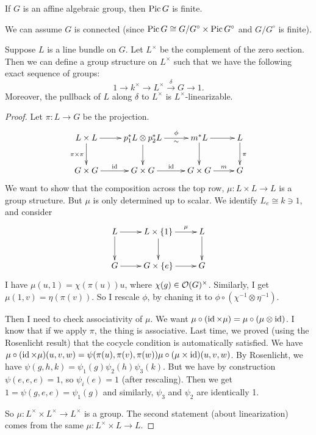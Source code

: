 
\begin{theorem}
 If $G$ is an affine algebraic group, then $\operatorname{Pic} G$ is finite.
\end{theorem}
We can assume $G$ is connected (since $\operatorname{Pic} G\cong G/G^\circ\times \operatorname{Pic} G^\circ$ and $G/G^\circ$ is finite).
\begin{proposition}
 Suppose $L$ is a line bundle on $G$. Let $L^\times$ be the complement of the zero section. Then we can define a group structure on $L^\times$ such that we have the following exact sequence of groups:
 \[
  1\to k^\times\to L^\times\xrightarrow\delta G\to 1.
 \]
 Moreover, the pullback of $L$ along $\delta$ to $L^\times$ is $L^\times$-linearizable.
\end{proposition}
\begin{proof}
 Let $\pi\colon L\to G$ be the projection.
 \[\xymatrix{
  L\times L\ar[d]_{\pi\times\pi}\ar[r] & p_1^*L\otimes p_2^*L\ar[d] \ar[r]^-\phi_-\sim & m^*L \ar[r]\ar[d] & L\ar[d]^\pi \\
  G\times G\ar[r]^\id & G\times G\ar[r]^\id & G\times G \ar[r]^-m & G
 }\]
  We want to show that the composition across the top row, $\mu\colon L\times L\to L$ is a group structure. But $\mu$ is only determined up to scalar. We identify $L_e\cong k\ni 1$, and consider
 \[\xymatrix{
  L\ar[r]\ar[d] & L\times\{1\}\ar[d]\ar[r]^-\mu & L\ar[d]\\
  G\ar[r] & G\times \{e\}\ar[r] & G
 }\]
 I have $\mu(u,1)=\chi(\pi(u))u$, where $\chi(g)\in \mathcal{O}(G)^\times$. Similarly, I get $\mu(1,v)=\eta(\pi(v))$. So I rescale $\phi$, by chaning it to $\phi\circ (\chi^{-1}\otimes \eta^{-1})$.
 
 Then I need to check associativity of $\mu$. We want $\mu\circ (\operatorname{id}\times \mu)=\mu\circ (\mu\otimes \operatorname{id})$. I know that if we apply $\pi$, the thing is associative. Last time, we proved (using the Rosenlicht result) that the cocycle condition is automatically satisfied. We have $\mu\circ (\operatorname{id}\times\mu) (u,v,w)=\psi(\pi(u),\pi(v),\pi (w)) \mu\circ (\mu\times \operatorname{id})(u,v,w)$. By Rosenlicht, we have $\psi(g,h,k)=\psi_1(g)\psi_2(h)\psi_3(k)$. But we have by construction $\psi(e,e,e)=1$, so $\psi_i(e)=1$ (after rescaling). Then we get $1=\psi(g,e,e)=\psi_1(g)$ and similarly, $\psi_3$ and $\psi_2$ are identically 1.
 
 So $\mu\colon L^\times\times L^\times\to L^\times$ is a group. The second statement (about linearization) comes from the same $\mu\colon L^\times\times L\to L$.
\end{proof}
